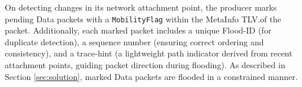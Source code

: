 \documentclass[10pt,conference]{IEEEtran}
\begin{document}
% 
% 
% 
% 
On detecting changes in its network attachment point, the producer marks pending Data packets with a \texttt{MobilityFlag} within the MetaInfo TLV.of the packet. Additionally, each marked packet includes a unique Flood-ID (for duplicate detection), a sequence number (ensuring correct ordering and consistency), and a trace-hint (a lightweight path indicator derived from recent attachment points, guiding packet direction during flooding). 
% 
As described in Section \ref{sec:solution}, marked Data packets are flooded in a constrained manner.

% 
\end{document}
